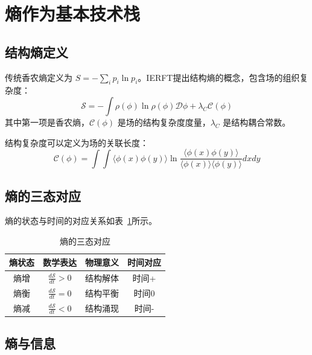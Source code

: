 \documentclass[12pt,a4paper]{article}
\begin{document}
\section{熵作为基本技术栈}

\subsection{结构熵定义}

传统香农熵定义为 $S = -\sum_i p_i \ln p_i$。IERFT提出结构熵的概念，包含场的组织复杂度：
\begin{equation}
\mathcal{S} = -\int \rho(\phi) \ln \rho(\phi) \mathcal{D}\phi + \lambda_C \mathcal{C}(\phi)
\end{equation}
其中第一项是香农熵，$\mathcal{C}(\phi)$ 是场的结构复杂度度量，$\lambda_C$ 是结构耦合常数。

结构复杂度可以定义为场的关联长度：
\begin{equation}
\mathcal{C}(\phi) = \int \int \langle \phi(x) \phi(y) \rangle \ln \frac{\langle \phi(x) \phi(y) \rangle}{\langle \phi(x) \rangle \langle \phi(y) \rangle} dx dy
\end{equation}

\subsection{熵的三态对应}

熵的状态与时间的对应关系如表~\ref{tab:entropy_states}所示。

\begin{table}[htbp]
\centering
\caption{熵的三态对应}
\label{tab:entropy_states}
\begin{tabular}{cccc}
\toprule
熵状态 & 数学表达 & 物理意义 & 时间对应 \\
\midrule
熵增 & $\frac{d\mathcal{S}}{dt} > 0$ & 结构解体 & 时间+ \\
熵衡 & $\frac{d\mathcal{S}}{dt} = 0$ & 结构平衡 & 时间0 \\
熵减 & $\frac{d\mathcal{S}}{dt} < 0$ & 结构涌现 & 时间- \\
\bottomrule
\end{tabular}
\end{table}

\subsection{熵与信息}
\end{document}
